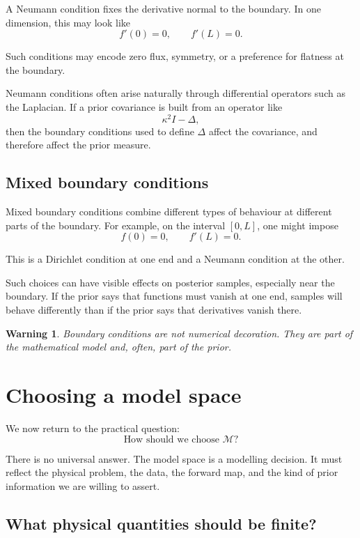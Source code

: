 \documentclass[11pt,a4paper]{book}
\newtheorem{warning}[definition]{Warning}
\newcommand{\M}{\mathcal{M}}      %
\begin{document}
A Neumann condition fixes the derivative normal to the boundary. In one
dimension, this may look like
\[
    f'(0)=0,
    \qquad
    f'(L)=0.
\]

Such conditions may encode zero flux, symmetry, or a preference for flatness at
the boundary.

Neumann conditions often arise naturally through differential operators such as
the Laplacian. If a prior covariance is built from an operator like
\[
    \kappa^2 I - \Delta,
\]
then the boundary conditions used to define $\Delta$ affect the covariance, and
therefore affect the prior measure.

\subsection{Mixed boundary conditions}

Mixed boundary conditions combine different types of behaviour at different
parts of the boundary. For example, on the interval $[0,L]$, one might impose
\[
    f(0)=0,
    \qquad
    f'(L)=0.
\]

This is a Dirichlet condition at one end and a Neumann condition at the other.

Such choices can have visible effects on posterior samples, especially near the
boundary. If the prior says that functions must vanish at one end, samples will
behave differently than if the prior says that derivatives vanish there.

\begin{warning}
Boundary conditions are not numerical decoration.
They are part of the mathematical model and, often, part of the prior.
\end{warning}

\section{Choosing a model space}

We now return to the practical question:
\[
    \text{How should we choose } \M?
\]

There is no universal answer. The model space is a modelling decision. It must
reflect the physical problem, the data, the forward map, and the kind of prior
information we are willing to assert.

\subsection{What physical quantities should be finite?}
\end{document}
